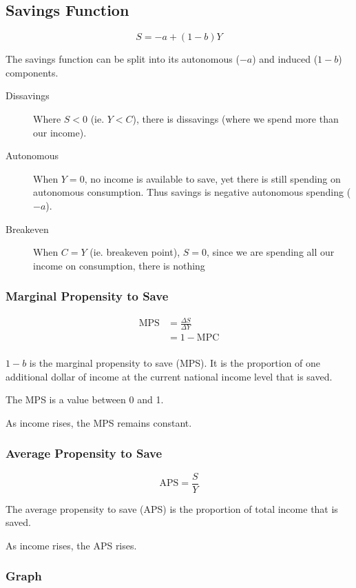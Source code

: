 \documentclass[a4paper,11pt]{article}
\begin{document}
\subsection{Savings Function}

$$
S = -a + (1 - b)Y
$$

The savings function can be split into its autonomous ($-a$) and induced
($1 - b$) components.

\begin{description}
\item [Dissavings] Where $S < 0$ (ie. $Y < C$), there is dissavings (where we
	spend more than our income).
\item [Autonomous] When $Y = 0$, no income is available to save, yet there is
	still spending on autonomous consumption. Thus savings is negative autonomous
	spending ($-a$).
\item [Breakeven] When $C = Y$ (ie. breakeven point), $S = 0$, since we are
	spending all our income on consumption, there is nothing
\end{description}


\subsubsection{Marginal Propensity to Save}

$$
\begin{aligned}
\mbox{MPS} & = \frac{\Delta S}{\Delta Y} \\
& = 1 - \mbox{MPC} \\
\end{aligned}
$$

$1 - b$ is the marginal propensity to save (MPS). It is the proportion of one
additional dollar of income at the current national income level that is saved.

The MPS is a value between 0 and 1.

As income rises, the MPS remains constant.


\subsubsection{Average Propensity to Save}

$$
\mbox{APS} = \frac{S}{Y}
$$

The average propensity to save (APS) is the proportion of total income that is
saved.

As income rises, the APS rises.



\subsubsection{Graph}
\end{document}
